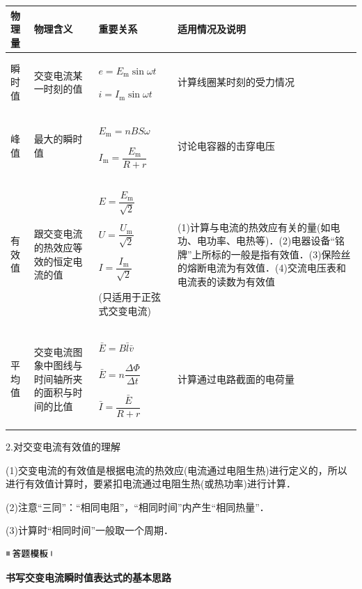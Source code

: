 \documentclass[cn,10.5pt,chinese,mac,chinesefont=founder]{elegantbook}
\begin{document}
\begin{longtable}[]{@{}m{1.2cm}m{2.5cm}m{2.5cm}m{6cm}@{}}
\toprule
物理量 & 物理含义 & 重要关系 & 适用情况及说明\tabularnewline
\midrule
\endhead
\begin{minipage}[t]{0.22\columnwidth}\raggedright
瞬时值\strut
\end{minipage} &交变电流某一时刻的值 &$e=E_{\mathrm{m}} \sin \omega t$

$i=I_{\mathrm{m}} \sin \omega t$& 
计算线圈某时刻的受力情况\tabularnewline
\begin{minipage}[t]{0.22\columnwidth}\raggedright
峰值\strut
\end{minipage} & 
最大的瞬时值&$E_{\mathrm{m}} =n B S \omega$ 

 $I_{\mathrm{m}} =\dfrac{E_{\mathrm{m}}}{R+r} $&
讨论电容器的击穿电压\tabularnewline
\begin{minipage}[t]{0.22\columnwidth}\raggedright
有效值\strut
\end{minipage} &跟交变电流的热效应等效的恒定电流的值& 

$E=\dfrac{E_{\mathrm{m}}}{\sqrt{2}}$

$U=\dfrac{U_{\mathrm{m}}}{\sqrt{2}}$

$I=\dfrac{I_{\mathrm{m}}}{\sqrt{2}}$

(只适用于正弦式交变电流)&
(1)计算与电流的热效应有关的量(如电功、电功率、电热等)．(2)电器设备``铭牌''上所标的一般是指有效值．(3)保险丝的熔断电流为有效值．(4)交流电压表和电流表的读数为有效值\tabularnewline
\begin{minipage}[t]{0.22\columnwidth}\raggedright
平均值\strut
\end{minipage} & 交变电流图象中图线与时间轴所夹的面积与时间的比值& $ \bar{E} =B \bar{l} \bar{v}$

$ \bar{E} =n \dfrac{\Delta \Phi}{\Delta t} $

$ \bar{I} =\dfrac{\bar{E}}{R+r} $&
计算通过电路截面的电荷量\tabularnewline
\bottomrule
\end{longtable}

2.对交变电流有效值的理解

(1)交变电流的有效值是根据电流的热效应(电流通过电阻生热)进行定义的，所以进行有效值计算时，要紧扣电流通过电阻生热(或热功率)进行计算．

(2)注意``三同''：``相同电阻''，``相同时间''内产生``相同热量''．

(3)计算时``相同时间''一般取一个周期．

\begin{center}\includegraphics[width=0.70764in,height=0.12292in]{media/image25.png}\end{center}
\begin{center}
	\textbf{书写交变电流瞬时值表达式的基本思路}
\end{center}
\end{document}

